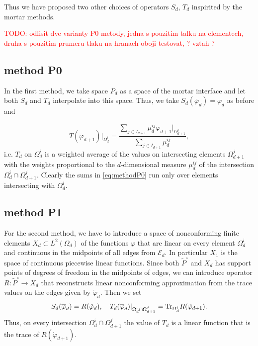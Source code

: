 \documentclass[times]{nlaauth}%
\def\Tr{{\rm Tr}}
\def\to{\rightarrow}
\def\ol#1{\overline{#1}}
\def\phi{\varphi}
\def\todo#1{\textcolor{red}{TODO: #1} }
\begin{document}

Thus we have proposed two other choices of operators $S_d$, $T_d$ 
inspirited by the mortar methods.

\todo{
odlisit dve varianty P0 metody, jedna s pouzitim talku na elementech, druha s pouzitim prumeru tlaku na hranach
oboji testovat, ? vztah ?
}
\subsection{method P0}
In the first method, we take space $P_d$ as a space of the mortar interface and let both $S_d$ and $T_d$ interpolate into this space.
Thus, we take $S_d(\ol\phi_d)=\phi_d$ as before and

\begin{equation}
    \label{eq:methodP0}
    T(\ol\phi_{d+1})|_{\Omega_d^i} = \frac{ \sum_{j\in I_{d+1}} \mu_{d}^{ij} \phi_{d+1}|_{\Omega_{d+1}^j}}
        { \sum_{j\in I_{d+1}} \mu_{d}^{ij}},  
\end{equation}
i.e. $T_d$ on $\Omega_d^i$ is a weighted average of the values on intersecting
elements $\Omega_{d+1}^j$ with the weights proportional to the $d$-dimensional measure $\mu_{d}^{ij}$ 
of the intersection $\Omega_d^i \cap \Omega_{d+1}^j$.
Clearly the sums in \eqref{eq:methodP0} run only over elements intersecting with $\Omega_d^i$.

\subsection{method P1}
For the second method, we have to introduce a space of nonconforming finite elements
$X_d \subset L^2(\Omega_d)$ of the functions $\phi$ that are linear on every element $\Omega_d^i$
and continuous in the midpoints of all edges from $\mathcal{E}_d$. In particular $X_1$ is the space of continuous piecewise linear functions.
Since both $\tilde{P}^\circ$ and $X_d$ has support points of degrees of freedom in the midpoints of edges, we can introduce
operator $R:\tilde{P}^\circ \to X_d$ that reconstructs linear nonconforming approximation from
the trace values on the edges given by $\mathring \phi_d$. Then we set 
\begin{equation}
  S_d(\ol\phi_d) = R(\mathring\phi_d),\quad T_d(\ol\phi_d)|_{\Omega_d^i \cap \Omega_{d+1}^j} = \Tr_{\Omega_{d}^i} R( \mathring\phi_{d+1}).
\end{equation}
Thus,  on every intersection $\Omega_d^i\cap \Omega_{d+1}^j$ the value of $T_d$ is a linear function
that  is the trace of $R(\mathring{\phi}_{d+1})$.
\end{document}
